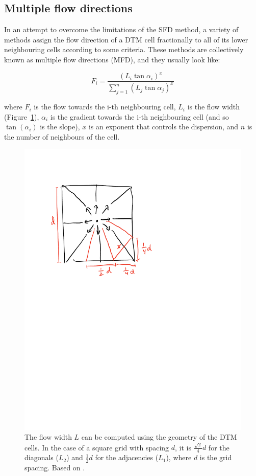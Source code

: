 \subsection{Multiple flow directions}

In an attempt to overcome the limitations of the SFD method, a variety of methods assign the flow direction of a DTM cell fractionally to all of its lower neighbouring cells according to some criteria.
These methods are collectively known as multiple flow directions (MFD), and they usually look like:

\begin{equation}
F_i = \frac{\left(L_i \tan{\alpha_i}\right)^x}{\sum_{j=1}^{n}\left(L_j \tan{\alpha_j}\right)^x}
\end{equation}

where \(F_i\) is the flow towards the i-th neighbouring cell, \(L_i\) is the flow width (Figure~\ref{fig:quinn}), \(\alpha_i\) is the gradient towards the i-th neighbouring cell (and so \(\tan(\alpha_i)\) is the slope), \(x\) is an exponent that controls the dispersion, and \(n\) is the number of neighbours of the cell.

\begin{figure}[htbp]
\centering
\includegraphics[width=0.5\linewidth]{figs/quinn.pdf}
\caption{The flow width \(L\) can be computed using the geometry of the DTM cells.
In the case of a square grid with spacing \(d\), it is \(\frac{\sqrt{2}}{4}d\) for the diagonals (\(L_2\)) and \(\frac{1}{2}d\) for the adjacencies (\(L_1\)), where \(d\) is the grid spacing. Based on \citet{Quinn91}.}%
\label{fig:quinn}
\end{figure}

